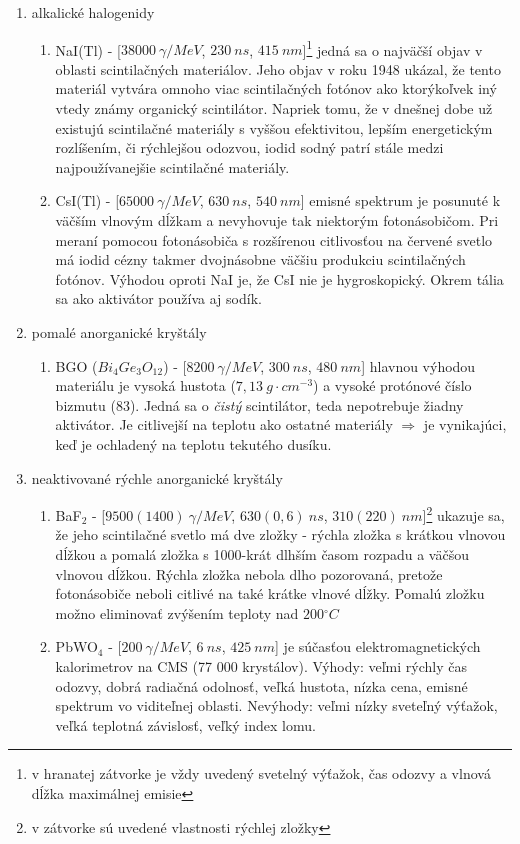 \documentclass[../../main.tex]{subfiles}
\begin{document}
\begin{enumerate}
\item alkalické halogenidy 
\begin{enumerate}
\item NaI(Tl) - [$38000\:\unit{\gamma/MeV}$, $230\:\unit{ns}$, $415\:\unit{nm}$]\footnote{v hranatej zátvorke je vždy uvedený svetelný výťažok, čas odozvy a vlnová dĺžka maximálnej emisie} jedná sa o najväčší objav v oblasti scintilačných materiálov. Jeho objav v roku 1948 ukázal, že tento materiál vytvára omnoho viac scintilačných fotónov ako ktorýkoľvek iný vtedy známy organický scintilátor. Napriek tomu, že v dnešnej dobe už existujú scintilačné materiály s vyššou efektivitou, lepším energetickým rozlíšením, či rýchlejšou odozvou, iodid sodný patrí stále medzi najpoužívanejšie scintilačné materiály.
\item CsI(Tl) - [$65000\:\unit{\gamma/MeV}$, $630\:\unit{ns}$, $540\:\unit{nm}$] emisné spektrum je posunuté k väčším vlnovým dĺžkam a nevyhovuje tak niektorým fotonásobičom. Pri meraní pomocou fotonásobiča s rozšírenou citlivosťou na červené svetlo má iodid cézny takmer dvojnásobne väčšiu produkciu scintilačných fotónov. Výhodou oproti NaI je, že CsI nie je hygroskopický. Okrem tália sa ako aktivátor používa aj sodík.
\end{enumerate}
\item pomalé anorganické kryštály
\begin{enumerate}
\item BGO ($Bi_4Ge_3O_{12}$) - [$8200\:\unit{\gamma/MeV}$, $300\:\unit{ns}$, $480\:\unit{nm}$] hlavnou výhodou materiálu je vysoká hustota ($7,13\:\unit{g\cdot cm^{-3}}$) a vysoké protónové číslo bizmutu (83). Jedná sa o \textit{čistý} scintilátor, teda nepotrebuje žiadny aktivátor. Je citlivejší na teplotu ako ostatné materiály $\Rightarrow$ je vynikajúci, keď je ochladený na teplotu tekutého dusíku.
\end{enumerate}
\item neaktivované rýchle anorganické kryštály
\begin{enumerate}
\item BaF$_2$ - [$9500(1400)\:\unit{\gamma/MeV}$, $630(0,6)\:\unit{ns}$, $310(220)\:\unit{nm}$]\footnote{v zátvorke sú uvedené vlastnosti rýchlej zložky} ukazuje sa, že jeho scintilačné svetlo má dve zložky - rýchla zložka s krátkou vlnovou dĺžkou a pomalá zložka s 1000-krát dlhším časom rozpadu a väčšou vlnovou dĺžkou. Rýchla zložka nebola dlho pozorovaná, pretože fotonásobiče neboli citlivé na také krátke vlnové dĺžky. Pomalú zložku možno eliminovať zvýšením teploty nad $200\unit{^\circ C}$
\item PbWO$_4$ - [$200\:\unit{\gamma/MeV}$, $6\:\unit{ns}$, $425\:\unit{nm}$] je súčasťou elektromagnetických kalorimetrov na CMS (77 000 krystálov). Výhody: veľmi rýchly čas odozvy, dobrá radiačná odolnosť, veľká hustota, nízka cena, emisné spektrum vo viditeľnej oblasti. Nevýhody: veľmi nízky sveteľný výťažok, veľká teplotná závislosť, veľký index lomu.
\end{enumerate}
\end{enumerate}
\end{document}
